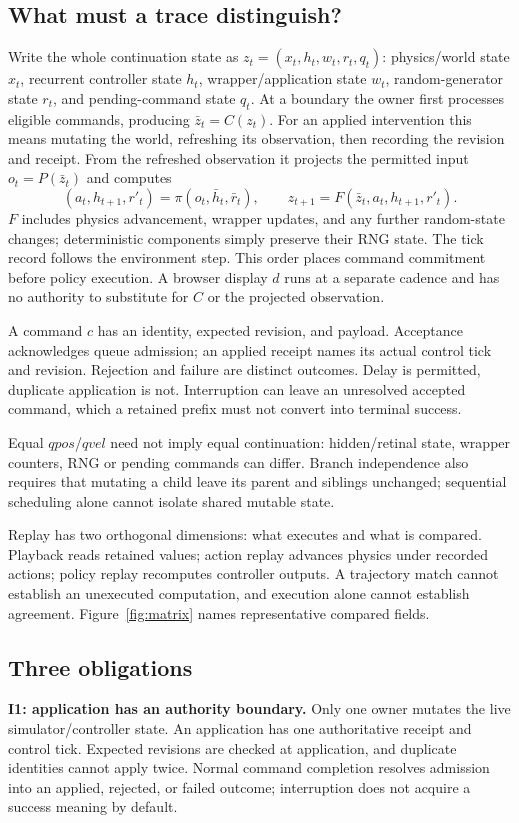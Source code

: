 \documentclass[10pt]{article}
\begin{document}
\subsection{What must a trace distinguish?}
Write the whole continuation state as $z_t=(x_t,h_t,w_t,r_t,q_t)$:
physics/world state $x_t$, recurrent controller state $h_t$, wrapper/application
state $w_t$, random-generator state $r_t$, and pending-command state $q_t$.
At a boundary the owner first processes eligible commands, producing
$\bar z_t=C(z_t)$. For an applied intervention this means mutating the world,
refreshing its observation, then recording the revision and receipt. From the
refreshed observation it projects the permitted input $o_t=P(\bar z_t)$ and computes
\[
 (a_t,h_{t+1},r'_t)=\pi(o_t,\bar h_t,\bar r_t),\qquad
 z_{t+1}=F(\bar z_t,a_t,h_{t+1},r'_t).
\]
$F$ includes physics advancement, wrapper updates, and any further random-state
changes; deterministic components simply preserve their RNG state. The tick
record follows the environment step. This order places command commitment
before policy execution. A browser display $d$ runs at a separate cadence and
has no authority to substitute for $C$ or the projected observation.

A command $c$ has an identity, expected revision, and payload. Acceptance
acknowledges queue admission; an applied receipt names its actual control tick
and revision. Rejection and failure are distinct outcomes. Delay is permitted,
duplicate application is not. Interruption can leave an unresolved accepted
command, which a retained prefix must not convert into terminal success.

Equal $qpos$/$qvel$ need not imply equal continuation: hidden/retinal state,
wrapper counters, RNG or pending commands can differ. Branch independence also
requires that mutating a child leave its parent and siblings unchanged;
sequential scheduling alone cannot isolate shared mutable state.

Replay has two orthogonal dimensions: what executes and what is compared.
Playback reads retained values; action replay advances physics under recorded
actions; policy replay recomputes controller outputs. A trajectory match cannot
establish an unexecuted computation, and execution alone cannot establish
agreement. Figure~\ref{fig:matrix} names representative compared fields.

\subsection{Three obligations}
\textbf{I1: application has an authority boundary.}
Only one owner mutates the live simulator/controller state. An application
has one authoritative receipt and control tick. Expected revisions are checked
at application, and duplicate identities cannot apply twice. Normal command
completion resolves admission into an applied, rejected, or failed outcome;
interruption does not acquire a success meaning by default.
\end{document}
